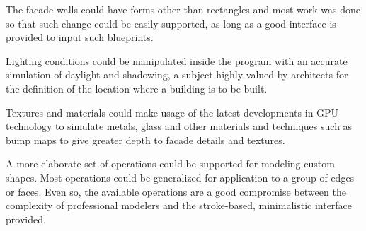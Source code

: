 The facade walls could have forms other than rectangles and most work was
done so that such change could be easily supported, as long as a good
interface is provided to input such blueprints.

Lighting conditions could be manipulated inside the program with an
accurate simulation of daylight and shadowing, a subject highly valued
by architects for the definition of the location where a building is to be built.

Textures and materials could make usage of the latest developments in GPU
technology to simulate metals, glass and other materials and
techniques such as bump maps to give greater depth to facade details and textures.

A more elaborate set of operations could be supported for modeling custom shapes.
Most operations could be generalized for application to a group of edges or faces.
Even so, the available operations are a good compromise between the complexity
of professional modelers and the stroke-based, minimalistic interface provided.

